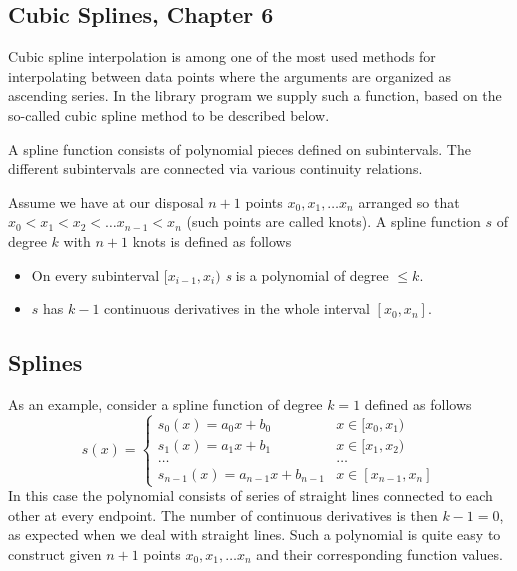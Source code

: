 \documentclass[%
twoside,                 %
final,                   %
10pt]{article}
\begin{document}
{{{{{{{%
\subsection{Cubic Splines, Chapter 6}
\begin{block}{}
Cubic spline interpolation is among one of the most used 
methods for interpolating between data points where the arguments
are organized as ascending series. In the library program we supply
such a function, based on the so-called cubic spline method to be 
described below. 

A spline function consists of polynomial pieces defined on
subintervals. The different subintervals are connected via
various continuity relations.

Assume we have at our disposal $n+1$ points $x_0, x_1, \dots x_n$ 
arranged so that $x_0 < x_1 < x_2 < \dots x_{n-1} < x_n$ (such points are called
knots). A spline function $s$ of degree $k$ with $n+1$ knots is defined
as follows
\begin{itemize}
 \item On every subinterval $[x_{i-1},x_i)$ \emph{s} is a polynomial of degree $\le k$.

 \item $s$ has $k-1$ continuous derivatives in the whole interval $[x_0,x_n]$.
\end{itemize}

\noindent
\end{block}



\subsection{Splines}
\begin{block}{}
As an example, consider a spline function of degree $k=1$ defined as follows
\[
    s(x)=\left\{\begin{array}{cc} s_0(x)=a_0x+b_0 & x\in [x_0, x_1) \\   
                             s_1(x)=a_1x+b_1 & x\in [x_1, x_2) \\   
                             \dots & \dots \\
                             s_{n-1}(x)=a_{n-1}x+b_{n-1} & x\in 
                             [x_{n-1}, x_n] \end{array}\right.
\]
In this case the polynomial consists of series of straight lines 
connected to each other at every endpoint. The number of continuous
derivatives is then $k-1=0$, as expected when we deal with straight lines.
Such a polynomial is quite easy to construct given
$n+1$ points $x_0, x_1, \dots x_n$ and their corresponding 
function values. 
\end{block}


}}}}}}}
\end{document}
